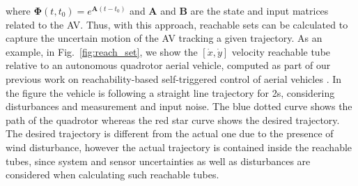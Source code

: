 where $\bm{\Phi}(t,t_0) = e^{\bm{A}(t-t_0)}$ and $\bm{A}$ and $\bm{B}$ are the state and input matrices related to the AV.
Thus, with this approach, reachable sets can be calculated to capture the uncertain motion of the AV tracking a given trajectory. 
As an example, in Fig.~\ref{fig:reach_set}, we show the $[\dot x, \dot y]$ velocity reachable tube relative to an autonomous quadrotor aerial vehicle, computed as part of our previous work on reachability-based self-triggered control of aerial vehicles \cite{esen18ICRA, esen17AHS, esen17ISAR}. In the figure the vehicle is following a straight line trajectory for 2s, considering disturbances and measurement and input noise.
The blue dotted curve shows the path of the quadrotor whereas the red star curve shows the desired trajectory. The desired trajectory is different from the actual one due to the presence of wind disturbance, however the actual trajectory is contained inside the reachable tubes, since system and sensor uncertainties as well as disturbances are considered when calculating such reachable tubes.

